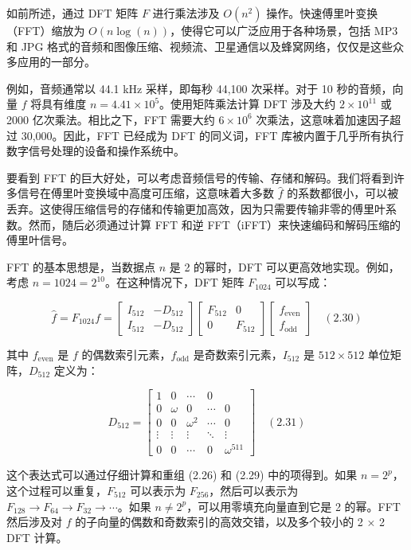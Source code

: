 \documentclass{ctexart}
\begin{document}
如前所述，通过 DFT 矩阵 \( F \) 进行乘法涉及 \( O(n^2) \) 操作。快速傅里叶变换（FFT）缩放为 \( O(n \log(n)) \)，使得它可以广泛应用于各种场景，包括 MP3 和 JPG 格式的音频和图像压缩、视频流、卫星通信以及蜂窝网络，仅仅是这些众多应用的一部分。

例如，音频通常以 44.1 kHz 采样，即每秒 44,100 次采样。对于 10 秒的音频，向量 \( f \) 将具有维度 \( n = 4.41 \times 10^5 \)。使用矩阵乘法计算 DFT 涉及大约 \( 2 \times 10^{11} \) 或 2000 亿次乘法。相比之下，FFT 需要大约 \( 6 \times 10^6 \) 次乘法，这意味着加速因子超过 30,000。因此，FFT 已经成为 DFT 的同义词，FFT 库被内置于几乎所有执行数字信号处理的设备和操作系统中。

要看到 FFT 的巨大好处，可以考虑音频信号的传输、存储和解码。我们将看到许多信号在傅里叶变换域中高度可压缩，这意味着大多数 \( \hat{f} \) 的系数都很小，可以被丢弃。这使得压缩信号的存储和传输更加高效，因为只需要传输非零的傅里叶系数。然而，随后必须通过计算 FFT 和逆 FFT（iFFT）来快速编码和解码压缩的傅里叶信号。

FFT 的基本思想是，当数据点 \( n \) 是 2 的幂时，DFT 可以更高效地实现。例如，考虑 \( n = 1024 = 2^{10} \)。在这种情况下，DFT 矩阵 \( F_{1024} \) 可以写成：

\[
\hat{f} = F_{1024} f =
\begin{bmatrix}
I_{512} & -D_{512} \\
I_{512} & -D_{512}
\end{bmatrix}
\begin{bmatrix}
F_{512} & 0 \\
0 & F_{512}
\end{bmatrix}
\begin{bmatrix}
f_{\text{even}} \\
f_{\text{odd}}
\end{bmatrix}
\quad (2.30)
\]

其中 \( f_{\text{even}} \) 是 \( f \) 的偶数索引元素，\( f_{\text{odd}} \) 是奇数索引元素，\( I_{512} \) 是 \( 512 \times 512 \) 单位矩阵，\( D_{512} \) 定义为：

\[
D_{512} =
\begin{bmatrix}
1 & 0 & \cdots & 0 \\
0 & \omega & 0 & \cdots & 0 \\
0 & 0 & \omega^2 & \cdots & 0 \\
\vdots & \vdots & \vdots & \ddots & \vdots \\
0 & 0 & \cdots & 0 & \omega^{511}
\end{bmatrix}
\quad (2.31)
\]

这个表达式可以通过仔细计算和重组 (2.26) 和 (2.29) 中的项得到。如果 \( n = 2^p \)，这个过程可以重复，\( F_{512} \) 可以表示为 \( F_{256} \)，然后可以表示为 \( F_{128} \rightarrow F_{64} \rightarrow F_{32} \rightarrow \cdots \)。如果 \( n \neq 2^p \)，可以用零填充向量直到它是 2 的幂。FFT 然后涉及对 \( f \) 的子向量的偶数和奇数索引的高效交错，以及多个较小的 2 × 2 DFT 计算。
\end{document}

